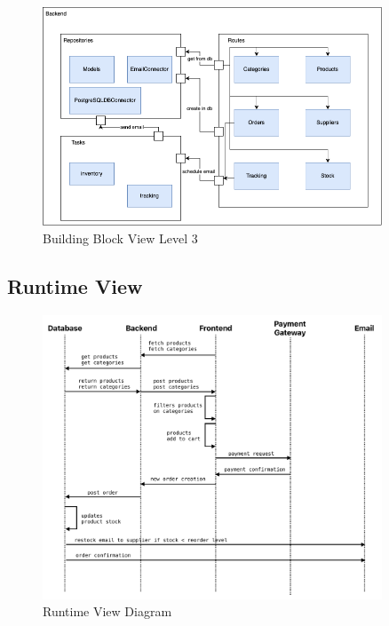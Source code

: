 \documentclass{llncs}
\begin{document}
\begin{figure}[H]
    \begin{center}
        \includegraphics[width=0.9\textwidth]{../diagrams/block_diagram-Level3.drawio.png}
        \vspace{0.01\textwidth}
        \caption{Building Block View Level 3}
        \label{BuildingBlockView3}
    \end{center}
\end{figure}


\subsection{Runtime View}
\begin{figure}[H]
    \begin{center}
        \includegraphics[width=0.9\textwidth]{../diagrams/runtimeview.png}
        \vspace{0.01\textwidth}
        \caption{Runtime View Diagram}
        \label{RuntimeView} %
    \end{center}
\end{figure}
\end{document}
